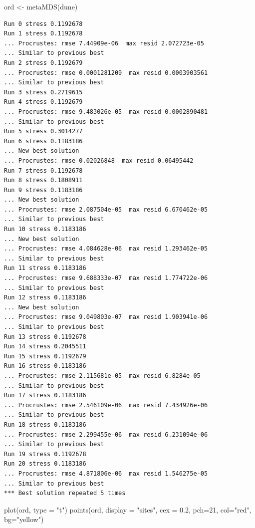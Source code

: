 \documentclass[
  letterpaper,
  DIV=11,
  numbers=noendperiod]{scrreprt}
\newenvironment{Shaded}{\begin{snugshade}}{\end{snugshade}}
\newcommand{\AttributeTok}[1]{\textcolor[rgb]{0.40,0.45,0.13}{#1}}
\newcommand{\DecValTok}[1]{\textcolor[rgb]{0.68,0.00,0.00}{#1}}
\newcommand{\FloatTok}[1]{\textcolor[rgb]{0.68,0.00,0.00}{#1}}
\newcommand{\FunctionTok}[1]{\textcolor[rgb]{0.28,0.35,0.67}{#1}}
\newcommand{\NormalTok}[1]{\textcolor[rgb]{0.00,0.23,0.31}{#1}}
\newcommand{\OtherTok}[1]{\textcolor[rgb]{0.00,0.23,0.31}{#1}}
\newcommand{\StringTok}[1]{\textcolor[rgb]{0.13,0.47,0.30}{#1}}
\begin{document}
\begin{Shaded}
\begin{Highlighting}[]
\NormalTok{ord }\OtherTok{\textless{}{-}} \FunctionTok{metaMDS}\NormalTok{(dune)}
\end{Highlighting}
\end{Shaded}

\begin{verbatim}
Run 0 stress 0.1192678 
Run 1 stress 0.1192678 
... Procrustes: rmse 7.44909e-06  max resid 2.072723e-05 
... Similar to previous best
Run 2 stress 0.1192679 
... Procrustes: rmse 0.0001281209  max resid 0.0003903561 
... Similar to previous best
Run 3 stress 0.2719615 
Run 4 stress 0.1192679 
... Procrustes: rmse 9.483026e-05  max resid 0.0002890481 
... Similar to previous best
Run 5 stress 0.3014277 
Run 6 stress 0.1183186 
... New best solution
... Procrustes: rmse 0.02026848  max resid 0.06495442 
Run 7 stress 0.1192678 
Run 8 stress 0.1808911 
Run 9 stress 0.1183186 
... New best solution
... Procrustes: rmse 2.087504e-05  max resid 6.670462e-05 
... Similar to previous best
Run 10 stress 0.1183186 
... New best solution
... Procrustes: rmse 4.084628e-06  max resid 1.293462e-05 
... Similar to previous best
Run 11 stress 0.1183186 
... Procrustes: rmse 9.688333e-07  max resid 1.774722e-06 
... Similar to previous best
Run 12 stress 0.1183186 
... New best solution
... Procrustes: rmse 9.049803e-07  max resid 1.903941e-06 
... Similar to previous best
Run 13 stress 0.1192678 
Run 14 stress 0.2045511 
Run 15 stress 0.1192679 
Run 16 stress 0.1183186 
... Procrustes: rmse 2.115681e-05  max resid 6.8284e-05 
... Similar to previous best
Run 17 stress 0.1183186 
... Procrustes: rmse 2.546109e-06  max resid 7.434926e-06 
... Similar to previous best
Run 18 stress 0.1183186 
... Procrustes: rmse 2.299455e-06  max resid 6.231094e-06 
... Similar to previous best
Run 19 stress 0.1192678 
Run 20 stress 0.1183186 
... Procrustes: rmse 4.871806e-06  max resid 1.546275e-05 
... Similar to previous best
*** Best solution repeated 5 times
\end{verbatim}

\begin{Shaded}
\begin{Highlighting}[]
\FunctionTok{plot}\NormalTok{(ord, }\AttributeTok{type =} \StringTok{"t"}\NormalTok{)}
\FunctionTok{points}\NormalTok{(ord, }\AttributeTok{display =} \StringTok{"sites"}\NormalTok{, }\AttributeTok{cex =} \FloatTok{0.2}\NormalTok{, }\AttributeTok{pch=}\DecValTok{21}\NormalTok{, }\AttributeTok{col=}\StringTok{"red"}\NormalTok{, }\AttributeTok{bg=}\StringTok{"yellow"}\NormalTok{)}
\end{Highlighting}
\end{Shaded}
\end{document}
